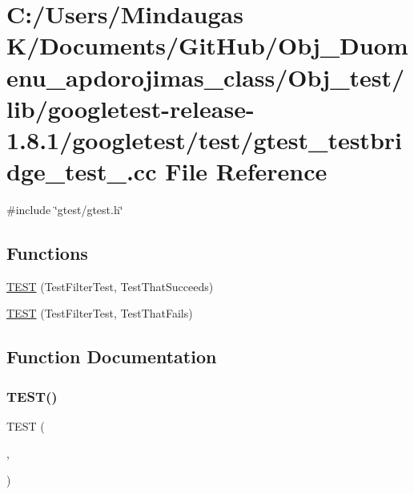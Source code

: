 \hypertarget{_obj__test_2lib_2googletest-release-1_88_81_2googletest_2test_2gtest__testbridge__test___8cc}{}\section{C\+:/\+Users/\+Mindaugas K/\+Documents/\+Git\+Hub/\+Obj\+\_\+\+Duomenu\+\_\+apdorojimas\+\_\+class/\+Obj\+\_\+test/lib/googletest-\/release-\/1.8.1/googletest/test/gtest\+\_\+testbridge\+\_\+test\+\_\+.cc File Reference}
\label{_obj__test_2lib_2googletest-release-1_88_81_2googletest_2test_2gtest__testbridge__test___8cc}
{\ttfamily \#include \char`\"{}gtest/gtest.\+h\char`\"{}}\newline
\subsection*{Functions}
\begin{DoxyCompactItemize}
\item 
\mbox{\hyperlink{_obj__test_2lib_2googletest-release-1_88_81_2googletest_2test_2gtest__testbridge__test___8cc_a5eeaeead411cc3c91e0eae2f2f4f5209}{T\+E\+ST}} (Test\+Filter\+Test, Test\+That\+Succeeds)
\item 
\mbox{\hyperlink{_obj__test_2lib_2googletest-release-1_88_81_2googletest_2test_2gtest__testbridge__test___8cc_aaaf6981970e3fe120e682eb203630242}{T\+E\+ST}} (Test\+Filter\+Test, Test\+That\+Fails)
\end{DoxyCompactItemize}


\subsection{Function Documentation}
\mbox{\label{_obj__test_2lib_2googletest-release-1_88_81_2googletest_2test_2gtest__testbridge__test___8cc_a5eeaeead411cc3c91e0eae2f2f4f5209}} 
\subsubsection{\texorpdfstring{TEST()}{TEST()}\hspace{0.1cm}{\footnotesize\ttfamily [1/2]}}
{\footnotesize\ttfamily T\+E\+ST (\begin{DoxyParamCaption}\item[{Test\+Filter\+Test}]{,  }\item[{Test\+That\+Succeeds}]{ }\end{DoxyParamCaption})}

